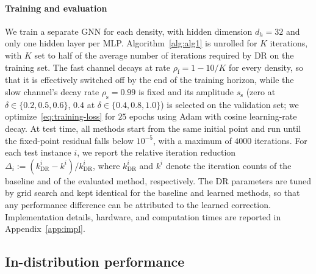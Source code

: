 \documentclass[final]{l4dc2026}
\begin{document}
\paragraph{Training and evaluation}
We train a separate GNN for each density, with hidden dimension $d_h=32$ and only one hidden layer per MLP. Algorithm~\ref{alg:alg1} is unrolled for $K$
iterations, with $K$ set to half of the average number of iterations
required by DR on the training set. The fast channel decays at rate
$\rho_{\mathrm f} = 1 - 10/K$ for every density, so that it is effectively switched off by the end of
the training horizon, while the slow channel's decay rate $\rho_{\mathrm s}=0.99$ is fixed and its amplitude $s_{\mathrm s}$ (zero at $\delta\in\{0.2,0.5,0.6\}$, $0.4$ at $\delta\in\{0.4,0.8,1.0\}$) is selected on the validation set; we
optimize~\eqref{eq:training-loss} for $25$ epochs using Adam with cosine learning-rate decay. At test time,
all methods start from the same initial point and run until the
fixed-point residual falls below $10^{-5}$, with a maximum of $4000$
iterations. For each test instance $i$, we report the relative iteration
reduction $\Delta_i := (k^i_{\mathrm{DR}} - k^i)/k^i_{\mathrm{DR}}$, where
$k^i_{\mathrm{DR}}$ and $k^i$ denote the iteration counts of the baseline
and of the evaluated method, respectively. The DR parameters are tuned by grid search and kept identical for the baseline and learned methods, so that any performance difference can be attributed to the learned correction. Implementation details, hardware, and computation times are reported in Appendix~\ref{app:impl}.



\subsection{In-distribution performance}
\end{document}
